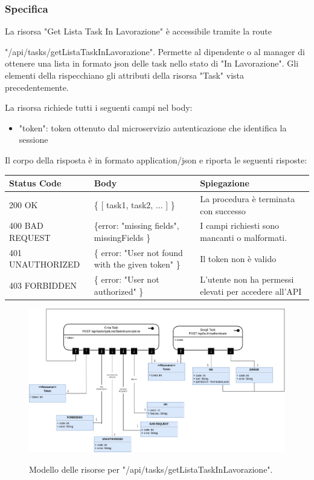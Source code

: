 \documentclass{report}
\begin{document}
\subsubsection*{Specifica}

La risorsa "Get Lista Task In Lavorazione" è accessibile tramite la route

 "/api/tasks/getListaTaskInLavorazione". Permette al dipendente o al manager di ottenere una lista in formato json delle task nello stato di "In Lavorazione". Gli elementi della rispecchiano gli attributi della risorsa "Task" vista precedentemente.

La risorsa richiede tutti i seguenti campi nel body:
\begin{itemize}
	\item "token": token ottenuto dal microservizio autenticazione che identifica la sessione
\end{itemize}

Il corpo della risposta è in formato application/json e riporta le seguenti risposte:

\begin{center} %
	\centering
	\begin{tabular}{ |p{4cm}|p{4cm}|p{4cm}| }
		\hline
		\centering Status Code & \qquad\qquad\quad Body & \qquad\quad Spiegazione\\ %
		\hline
		200 OK & \{ [ task1, task2, ... ] \}  & La procedura è terminata con successo	\\ 
		\hline
		400 BAD REQUEST & \{error: "missing fields", missingFields \} & I campi richiesti sono mancanti o malformati. \\
		\hline
		401 UNAUTHORIZED & \{ error: "User not found with the given token" \} & Il token non è valido \\
		\hline
		403 FORBIDDEN & \{ error: "User not authorized" \} &  L'utente non ha permessi elevati per accedere all'API \\
		\hline
	\end{tabular}
\end{center}

\begin{figure}[H]
	\centering\includegraphics[width=1\textwidth]{images/model_in_lavorazione.png}
	
	Modello delle risorse per "/api/tasks/getListaTaskInLavorazione".
\end{figure}
\end{document}
